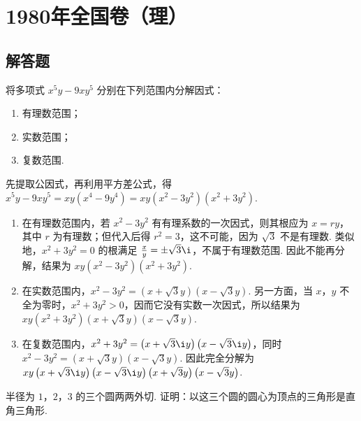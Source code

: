 \chapter{1980年全国卷（理）}

\section{解答题}

\begin{problem}
将多项式 \(x^{5}y - 9xy^{5}\) 分别在下列范围内分解因式：

\begin{enumerate}
\item 有理数范围；
\item 实数范围；
\item 复数范围.
\end{enumerate}
\end{problem}

\begin{solution}
先提取公因式，再利用平方差公式，得
\(x^{5}y-9xy^{5}=xy\left(x^{4}-9y^{4}\right)=xy\left(x^{2}-3y^{2}\right)\left(x^{2}+3y^{2}\right)\).

\begin{enumerate}
\item 在有理数范围内，若 \(x^{2}-3y^{2}\) 有有理系数的一次因式，则其根应为 \(x=ry\)，其中 \(r\) 为有理数；但代入后得 \(r^{2}=3\)，这不可能，因为 \(\sqrt{3}\) 不是有理数. 类似地，\(x^{2}+3y^{2}=0\) 的根满足 \(\frac{x}{y}=\pm\sqrt{3}\i\)，不属于有理数范围. 因此不能再分解，结果为 \(xy\left(x^{2}-3y^{2}\right)\left(x^{2}+3y^{2}\right)\).
\item 在实数范围内，\(x^{2}-3y^{2}=\left(x+\sqrt{3}y\right)\left(x-\sqrt{3}y\right)\). 另一方面，当 \(x\)，\(y\) 不全为零时，\(x^{2}+3y^{2}>0\)，因而它没有实数一次因式，所以结果为 \(xy\left(x^{2}+3y^{2}\right)\left(x+\sqrt{3}y\right)\left(x-\sqrt{3}y\right)\).
\item 在复数范围内，\(x^{2}+3y^{2}=\left(x+\sqrt{3}\i y\right)\left(x-\sqrt{3}\i y\right)\)，同时 \(x^{2}-3y^{2}=\left(x+\sqrt{3}y\right)\left(x-\sqrt{3}y\right)\). 因此完全分解为 \(xy\left(x+\sqrt{3}\i y\right)\left(x-\sqrt{3}\i y\right)\left(x+\sqrt{3}y\right)\left(x-\sqrt{3}y\right)\).
\end{enumerate}
\end{solution}

\begin{problem}
半径为 \(1\)，\(2\)，\(3\) 的三个圆两两外切. 证明：以这三个圆的圆心为顶点的三角形是直角三角形.
\end{problem}

